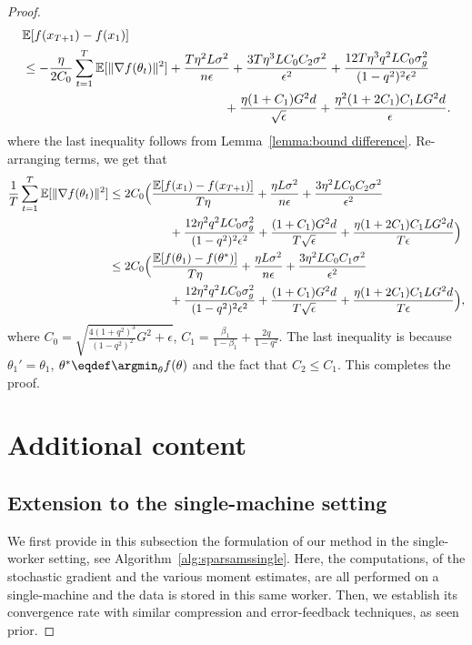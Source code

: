 \documentclass[11pt]{article}
\begin{document}
\begin{proof}
\begin{align*}
    &\mathbb E[f(x_{T+1})-f(x_1)]\\
    &\leq -\frac{\eta}{2C_0}\sum_{t=1}^T\mathbb E[\|\nabla f(\theta_t)\|^2]+\frac{T\eta^2 L \sigma^2}{n\epsilon}+\frac{3T\eta^3 LC_0C_2\sigma^2}{\epsilon^2}+\frac{12T\eta^3q^2LC_0\sigma_g^2}{(1-q^2)^2\epsilon^2}  \\
    &\hspace{2.2in} + \frac{\eta (1+C_1)G^2d}{\sqrt\epsilon}+\frac{\eta^2 (1+2C_1)C_1LG^2d}{\epsilon}.
\end{align*}
where the last inequality follows from Lemma~\ref{lemma:bound difference}. Re-arranging terms, we get that
\begin{align*}
    \frac{1}{T}\sum_{t=1}^T \mathbb E[\|\nabla f(\theta_t)\|^2]&\leq 2C_0\Big(\frac{\mathbb E[f(x_1)-f(x_{T+1})]}{T\eta}+\frac{\eta L \sigma^2}{n\epsilon}+\frac{3\eta^2 LC_0C_2\sigma^2}{\epsilon^2}  \\
    &\hspace{0.7in} + \frac{12\eta^2q^2LC_0\sigma_g^2}{(1-q^2)^2\epsilon^2}+\frac{ (1+C_1)G^2d}{T\sqrt\epsilon}+\frac{\eta (1+2C_1)C_1LG^2d}{T\epsilon} \Big)\\
    &\leq 2C_0\Big(\frac{\mathbb E[f(\theta_1)-f(\theta^*)]}{T\eta}+\frac{\eta L \sigma^2}{n\epsilon}+\frac{3\eta^2 LC_0C_1\sigma^2}{\epsilon^2}  \\
    &\hspace{0.7in} + \frac{12\eta^2q^2LC_0\sigma_g^2}{(1-q^2)^2\epsilon^2}+\frac{ (1+C_1)G^2d}{T\sqrt\epsilon}+\frac{\eta (1+2C_1)C_1LG^2d}{T\epsilon} \Big),
\end{align*}
where $C_0=\sqrt{\frac{4(1+q^2)^3}{(1-q^2)^2}G^2+\epsilon}$, $C_1=\frac{\beta_1}{1-\beta_1}+\frac{2q}{1-q^2}$. The last inequality is because $\theta_1'=\theta_1$, $\theta^* \eqdef \argmin_\theta f(\theta)$ and the fact that $C_2\leq C_1$. This completes the proof.


\section{Additional content}

\subsection{Extension to the single-machine setting}

We first provide in this subsection the formulation of our method in the single-worker setting, see Algorithm~\ref{alg:sparsamssingle}.
Here, the computations, of the stochastic gradient and the various moment estimates, are all performed on a single-machine and the data is stored in this same worker.
Then, we establish its convergence rate with similar compression and error-feedback techniques, as seen prior.


\end{proof}
\end{document}
